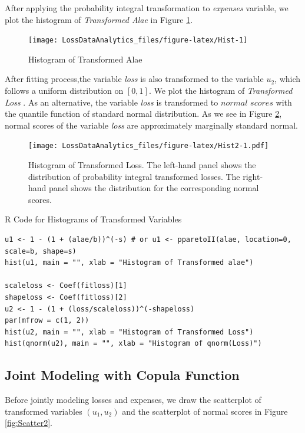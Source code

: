 \documentclass[]{book}
\theoremstyle{definition}
\theoremstyle{definition}
\theoremstyle{definition}
\theoremstyle{remark}
\begin{document}
After applying the probability integral transformation to \emph{expenses
} variable, we plot the histogram of \emph{Transformed Alae } in Figure
\ref{fig:Hist}.

\begin{figure}

{\centering \texttt{[image: LossDataAnalytics\_files/figure-latex/Hist-1]} 

}

\caption{Histogram of Transformed Alae}\label{fig:Hist}
\end{figure}

After fitting process,the variable \emph{loss} is also transformed to
the variable \(u_2\), which follows a uniform distribution on \([0,1]\).
We plot the histogram of \emph{Transformed Loss }. As an alternative,
the variable \emph{loss} is transformed to \(normal\) \(scores\) with
the quantile function of standard normal distribution. As we see in
Figure \ref{fig:Hist2}, normal scores of the variable \emph{loss} are
approximately marginally standard normal.

\begin{figure}
\centering
\texttt{[image: LossDataAnalytics\_files/figure-latex/Hist2-1.pdf]}
\caption{\label{fig:Hist2}Histogram of Transformed Loss. The left-hand panel
shows the distribution of probability integral transformed losses. The
right-hand panel shows the distribution for the corresponding normal
scores.}
\end{figure}

R Code for Histograms of Transformed Variables

\hypertarget{display.transalae.2}{}
\begin{verbatim}
u1 <- 1 - (1 + (alae/b))^(-s) # or u1 <- pparetoII(alae, location=0, scale=b, shape=s)
hist(u1, main = "", xlab = "Histogram of Transformed alae")

scaleloss <- Coef(fitloss)[1]
shapeloss <- Coef(fitloss)[2]
u2 <- 1 - (1 + (loss/scaleloss))^(-shapeloss)
par(mfrow = c(1, 2))
hist(u2, main = "", xlab = "Histogram of Transformed Loss")
hist(qnorm(u2), main = "", xlab = "Histogram of qnorm(Loss)")
\end{verbatim}

\subsection{Joint Modeling with Copula
Function}\label{joint-modeling-with-copula-function}

Before jointly modeling losses and expenses, we draw the scatterplot of
transformed variables \((u_1, u_2)\) and the scatterplot of normal
scores in Figure \ref{fig:Scatter2}.
\end{document}
